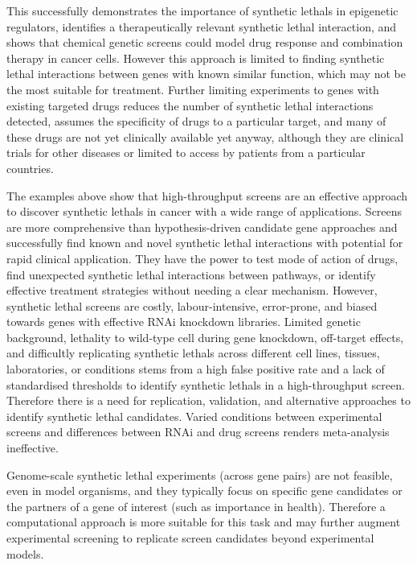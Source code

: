 This successfully demonstrates the importance of \glspl{synthetic lethal} in epigenetic regulators, identifies a therapeutically relevant \gls{synthetic lethal} interaction, and shows that chemical genetic screens could model drug response and combination therapy in cancer cells. However this approach is limited to finding \gls{synthetic lethal} interactions between genes with known similar function, which may not be the most suitable for treatment. Further limiting experiments to genes with existing targeted drugs reduces the number of \gls{synthetic lethal} interactions detected, assumes the specificity of drugs to a particular target, and many of these drugs are not yet clinically available yet anyway, although they are clinical trials for other diseases or limited to access by patients from a particular countries.  

The examples above show that high-throughput screens are an effective approach to discover \glspl{synthetic lethal} in cancer with a wide range of applications. Screens are more comprehensive than hypothesis-driven candidate gene approaches and successfully find known and novel \gls{synthetic lethal} interactions with potential for rapid clinical application. They have the power to test mode of action of drugs, find unexpected \gls{synthetic lethal} interactions between pathways, or identify effective treatment strategies without needing a clear mechanism. However, \gls{synthetic lethal} screens are costly, labour-intensive, error-prone, and biased towards genes with effective \gls{RNAi} knockdown libraries. Limited genetic background, lethality to wild-type cell during gene knockdown, off-target effects, and difficultly replicating \glspl{synthetic lethal} across different cell lines, tissues, laboratories, or conditions stems from a high false positive rate and a lack of standardised thresholds to identify \glspl{synthetic lethal} in a high-throughput screen. Therefore there is a need for replication, validation, and alternative approaches to identify \gls{synthetic lethal} candidates. Varied conditions between experimental screens and differences between \gls{RNAi} and drug screens renders meta-analysis ineffective.

Genome-scale \gls{synthetic lethal} experiments (across gene pairs) are not feasible, even in model organisms, and they typically focus on specific gene candidates or the partners of a gene of interest (such as importance in health). Therefore a computational approach is more suitable for this task and may further augment experimental screening to replicate screen candidates beyond experimental models.  


